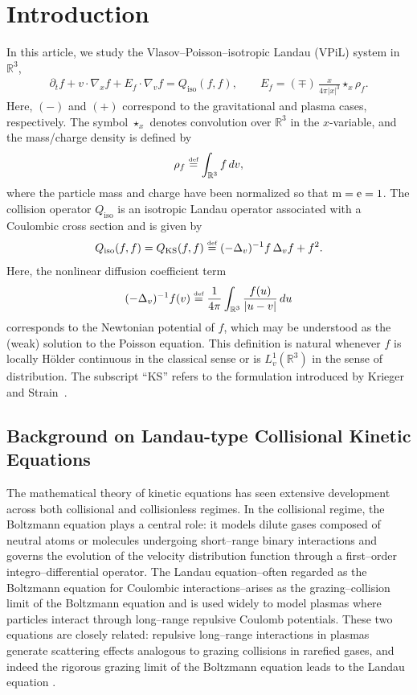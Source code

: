 \documentclass[reqno,11pt,final]{amsart}
\theoremstyle{plain}
\numberwithin{equation}{section}
\numberwithin{theorem}{section}
\newcommand{\eqdef }{\overset{\mbox{\tiny{def}}}{=}}
\begin{document}
\section{Introduction}
\label{Introduction}
In this article, we study the Vlasov--Poisson--isotropic Landau (VPiL) system in $\mathbb{R}^3$,
\begin{align}\label{VPiL}
    \partial_t f + v \cdot \nabla_x f + E_f \cdot \nabla_v f
    = Q_{\mathrm{iso}}(f,f),
    \qquad
    E_f = (\mp)\,\frac{x}{4\pi |x|^3} \star_x \rho_f .
\end{align}
Here, $(-)$ and $(+)$ correspond to the gravitational and plasma cases, respectively.
The symbol $\star_x$ denotes convolution over $\mathbb{R}^3$ in the $x$-variable, and the mass/charge density is defined by
$$
    \rho_f \eqdef \int_{\mathbb{R}^3} f\,dv ,
$$
where the particle mass and charge have been normalized so that $\textup{m}=\textup{e}=1$.
The collision operator $Q_{\mathrm{iso}}$ is an isotropic Landau operator associated with a Coulombic cross section and is given by
\begin{align}\label{def.Qiso}
    Q_{\mathrm{iso}}(f,f)
    = Q_{\mathrm{KS}}(f,f)
    \eqdef (-\Delta_v)^{-1} f \, \Delta_v f + f^2 .
\end{align}
Here, the nonlinear diffusion coefficient term
$$
    (-\Delta_v)^{-1} f(v)
    \eqdef \frac{1}{4\pi}
    \int_{\mathbb{R}^3} \frac{f(u)}{|u-v|}\,du
$$
corresponds to the Newtonian potential of $f$, which may be understood as the (weak) solution to the Poisson equation.
This definition is natural whenever $f$ is locally H\"older continuous in the classical sense or is $L_v^1(\mathbb{R}^3)$ in the sense of distribution.
The subscript ``KS'' refers to the formulation introduced by Krieger and Strain~\cite{iL_KS_2012}.



\subsection{Background on Landau-type Collisional Kinetic Equations}\label{Background}

The mathematical theory of kinetic equations has seen extensive development across both collisional and collisionless regimes. In the collisional regime, the Boltzmann equation plays a central role: it models dilute gases composed of neutral atoms or molecules undergoing short--range binary interactions and governs the evolution of the velocity distribution function through a first--order integro--differential operator. The Landau equation--often regarded as the Boltzmann equation for Coulombic interactions--arises as the grazing--collision limit of the Boltzmann equation and is used widely to model plasmas where particles interact through long--range repulsive Coulomb potentials. These two equations are closely related: repulsive long--range interactions in plasmas generate scattering effects analogous to grazing collisions in rarefied gases, and indeed the rigorous grazing limit of the Boltzmann equation leads to the Landau equation \cite{Limit_Desvillettes_1992}.
\end{document}
